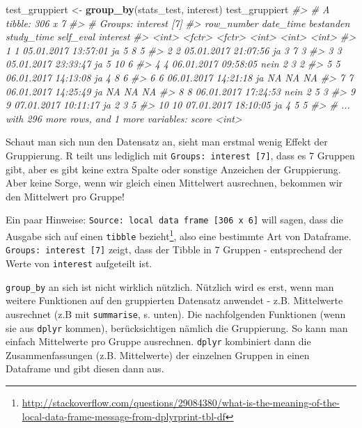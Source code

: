 \documentclass[12pt,ngerman,]{book}
\makeatletter
\newenvironment{Shaded}{\begin{snugshade}}{\end{snugshade}}
\newcommand{\KeywordTok}[1]{\textcolor[rgb]{0.13,0.29,0.53}{\textbf{#1}}}
\newcommand{\StringTok}[1]{\textcolor[rgb]{0.31,0.60,0.02}{#1}}
\newcommand{\CommentTok}[1]{\textcolor[rgb]{0.56,0.35,0.01}{\textit{#1}}}
\newcommand{\NormalTok}[1]{#1}
\let\rmarkdownfootnote\footnote%
\def\footnote{\protect\rmarkdownfootnote}
\newenvironment{kframe}{%
\medskip{}
\setlength{\fboxsep}{.8em}
 \def\at@end@of@kframe{}%
 \ifinner\ifhmode%
  \def\at@end@of@kframe{\end{minipage}}%
  \begin{minipage}{\columnwidth}%
 \fi\fi%
 \def\FrameCommand##1{\hskip\@totalleftmargin \hskip-\fboxsep
 \colorbox{shadecolor}{##1}\hskip-\fboxsep
     \hskip-\linewidth \hskip-\@totalleftmargin \hskip\columnwidth}%
 \MakeFramed {\advance\hsize-\width
   \@totalleftmargin\z@ \linewidth\hsize
   \@setminipage}}%
 {\par\unskip\endMakeFramed%
 \at@end@of@kframe}
\renewenvironment{Shaded}{\begin{kframe}}{\end{kframe}}
\theoremstyle{definition}
\theoremstyle{definition}
\theoremstyle{remark}
\makeatother
\begin{document}
\begin{Shaded}
\begin{Highlighting}[]
\NormalTok{test_gruppiert <-}\StringTok{ }\KeywordTok{group_by}\NormalTok{(stats_test, interest)}
\NormalTok{test_gruppiert}
\CommentTok{#> # A tibble: 306 x 7}
\CommentTok{#> # Groups:   interest [7]}
\CommentTok{#>    row_number           date_time bestanden study_time self_eval interest}
\CommentTok{#>         <int>              <fctr>    <fctr>      <int>     <int>    <int>}
\CommentTok{#>  1          1 05.01.2017 13:57:01        ja          5         8        5}
\CommentTok{#>  2          2 05.01.2017 21:07:56        ja          3         7        3}
\CommentTok{#>  3          3 05.01.2017 23:33:47        ja          5        10        6}
\CommentTok{#>  4          4 06.01.2017 09:58:05      nein          2         3        2}
\CommentTok{#>  5          5 06.01.2017 14:13:08        ja          4         8        6}
\CommentTok{#>  6          6 06.01.2017 14:21:18        ja         NA        NA       NA}
\CommentTok{#>  7          7 06.01.2017 14:25:49        ja         NA        NA       NA}
\CommentTok{#>  8          8 06.01.2017 17:24:53      nein          2         5        3}
\CommentTok{#>  9          9 07.01.2017 10:11:17        ja          2         3        5}
\CommentTok{#> 10         10 07.01.2017 18:10:05        ja          4         5        5}
\CommentTok{#> # ... with 296 more rows, and 1 more variables: score <int>}
\end{Highlighting}
\end{Shaded}

Schaut man sich nun den Datensatz an, sieht man erstmal wenig Effekt der
Gruppierung. R teilt uns lediglich mit
\texttt{Groups:\ interest\ {[}7{]}}, dass es 7 Gruppen gibt, aber es
gibt keine extra Spalte oder sonstige Anzeichen der Gruppierung. Aber
keine Sorge, wenn wir gleich einen Mittelwert ausrechnen, bekommen wir
den Mittelwert pro Gruppe!

Ein paar Hinweise: \texttt{Source:\ local\ data\ frame\ {[}306\ x\ 6{]}}
will sagen, dass die Ausgabe sich auf einen \texttt{tibble}
bezieht\footnote{\url{http://stackoverflow.com/questions/29084380/what-is-the-meaning-of-the-local-data-frame-message-from-dplyrprint-tbl-df}},
also eine bestimmte Art von Dataframe.
\texttt{Groups:\ interest\ {[}7{]}} zeigt, dass der Tibble in 7 Gruppen
- entsprechend der Werte von \texttt{interest} aufgeteilt ist.

\texttt{group\_by} an sich ist nicht wirklich nützlich. Nützlich wird es
erst, wenn man weitere Funktionen auf den gruppierten Datensatz anwendet
- z.B. Mittelwerte ausrechnet (z.B mit \texttt{summarise}, s. unten).
Die nachfolgenden Funktionen (wenn sie aus \texttt{dplyr} kommen),
berücksichtigen nämlich die Gruppierung. So kann man einfach Mittelwerte
pro Gruppe ausrechnen. \texttt{dplyr} kombiniert dann die
Zusammenfassungen (z.B. Mittelwerte) der einzelnen Gruppen in einen
Dataframe und gibt diesen dann aus.
\end{document}
